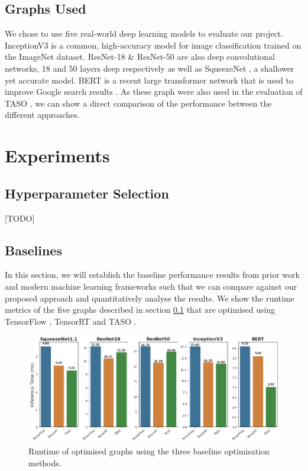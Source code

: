 \subsection{Graphs Used}
\label{sec:eval:subsec:graphsused}

We chose to use five real-world deep learning models to evaluate our project. InceptionV3 \cite{szegedy2015rethinking} is a common, high-accuracy model for image classification trained on the ImageNet dataset. ResNet-18 \& ResNet-50 \cite{he2015deep} are also deep convolutional networks, 18 and 50 layers deep respectively as well as SqueezeNet \cite{iandola2016squeezenet}, a shallower yet accurate model. BERT \cite{devlin2019bert} is a recent large transformer network that is used to improve Google search results \cite{nayak2019}. As these graph were also used in the evaluation of TASO \cite{jia2019taso}, we can show a direct comparison of the performance between the different approaches.

\section{Experiments}

\subsection{Hyperparameter Selection}
[TODO]

\subsection{Baselines}
\label{sec:eval:subsec:baseline}

In this section, we will establish the baseline performance results from prior work and modern machine learning frameworks such that we can compare against our proposed approach and quantitatively analyse the results. We show the runtime metrics of the five graphs described in section \ref{sec:eval:subsec:graphsused} that are optimised using TensorFlow \cite{tensorflow2015-whitepaper}, TensorRT \cite{tensorrt2017} and TASO \cite{jia2019taso}.


\begin{figure}[h]
  \centering
  \includegraphics[width=1\columnwidth]{sections/5evaluation/images/baseline_runtimes.png}
  \caption[Baseline runtimes of optimised graphs]{Runtime of optimised graphs using the three baseline optimisation methods.}
  \label{fig:eval:baseline-runtimes}
\end{figure}

